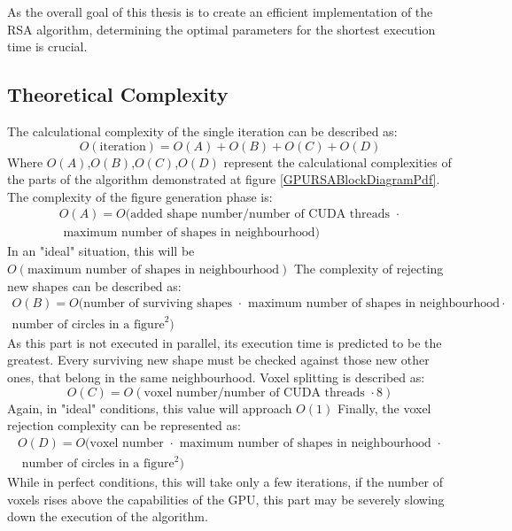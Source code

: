 \documentclass[12pt, oneside]{report}
\begin{document}
As the overall goal of this thesis is to create an efficient implementation of the RSA algorithm, determining the optimal parameters for the shortest execution time is crucial.

\subsection{Theoretical Complexity}

The calculational complexity of the single iteration can be described as: \newline
\begin{equation*}
	O(\text{iteration}) = O(A)+O(B)+O(C)+O(D)
\end{equation*}
Where $O(A)$,$O(B)$,$O(C)$,$O(D)$ represent the calculational complexities of the parts of the algorithm demonstrated at figure \ref{GPURSABlockDiagramPdf}. The complexity of the figure generation phase is:
\begin{gather*}
	O(A) = O(\text{added shape number}/ \text{number of CUDA threads } \cdot \\ \text{ maximum number of shapes in neighbourhood})
\end{gather*}
In an "ideal" situation, this will be $O(\text{maximum number of shapes in neighbourhood})$ \newline
The complexity of rejecting new shapes can be described as: \newline
\begin{gather*}
	O(B) = O(\text{number of surviving shapes } \cdot
	\text{ maximum number of shapes in neighbourhood} \cdot \\ \text{number of circles in a figure}^2)
\end{gather*}
As this part is not executed in parallel, its execution time is predicted to be the greatest. Every surviving new shape must be checked against those new other ones, that belong in the same neighbourhood. \newline
Voxel splitting is described as: \newline
\begin{equation*}
	O(C) = O(\text{voxel number}/ \text{number of CUDA threads } \cdot 8)
\end{equation*}
Again, in "ideal" conditions, this value will approach $O(1)$ \newline
Finally, the voxel rejection complexity can be represented as:
\begin{gather*}
	O(D) = O(\text{voxel number } \cdot  \text{ maximum number of shapes in neighbourhood } \cdot \\ \text{ number of circles in a figure}^2)
\end{gather*}
While in perfect conditions, this will take only a few iterations, if the number of voxels rises above the capabilities of the GPU, this part may be severely slowing down the execution of the algorithm.
\end{document}
